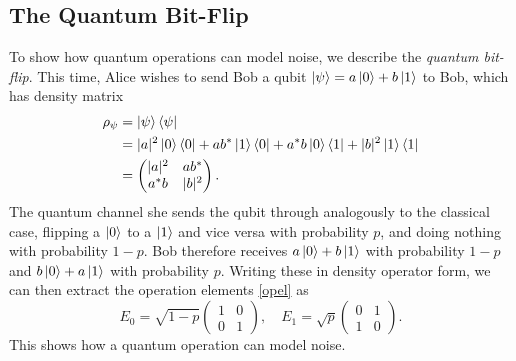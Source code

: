 \documentclass[12pt,a4paper]{report}
\numberwithin{equation}{section}
\newcommand{\ketbra}[2]{\ket{#1}\bra{#2}}
\newcommand{\ketbras}[1]{\ketbra{#1}{#1}}
\theoremstyle{definition}
\theoremstyle{theorem}
\theoremstyle{theorem}
\theoremstyle{example}
\theoremstyle{definition}
\begin{document}
\subsection{The Quantum Bit-Flip}
To show how quantum operations can model noise, we describe the \textit{quantum bit-flip}. This time, Alice wishes to send Bob a qubit $\ket{\psi}=a\ket{0}+b\ket{1}$ to Bob, which has density matrix
\begin{equation}
	\begin{aligned} 
		\rho_{\psi}&=\ketbras{\psi}\\&=|a|^{2}\ketbras{0}+ab^{*}\ketbra{1}{0}+a^{*}b\ketbra{0}{1}+|b|^{2}\ketbras{1}\\&=\begin{pmatrix}
			|a|^{2}&ab^{*}\\a^{*}b&|b|^{2}
		\end{pmatrix}.
	\end{aligned}
\end{equation}
The quantum channel she sends the qubit through analogously to the classical case, flipping a $\ket{0}$ to a $\ket{1}$ and vice versa with probability $p$, and doing nothing with probability $1-p$. Bob therefore receives $a\ket{0}+b\ket{1}$ with probability $1-p$ and $b\ket{0}+a\ket{1}$ with probability $p$. Writing these in density operator form, we can then extract the operation elements \ref{opel} as
\begin{equation}
	E_{0}=\sqrt{1-p}\begin{pmatrix}1&0\\0&1\end{pmatrix},\quad E_{1}=\sqrt{p}\begin{pmatrix}0&1\\1&0\end{pmatrix}.
\end{equation}
This shows how a quantum operation can model noise.
\end{document}
